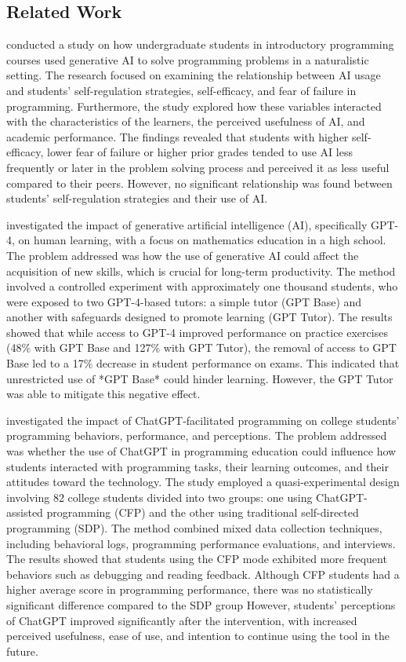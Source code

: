 \documentclass[a4paper,twoside]{article}
\begin{document}
\subsection{Related Work}

\cite{Margulieux24} conducted a study on how undergraduate students in
introductory programming courses used generative AI to solve programming
problems in a naturalistic setting. The research focused on examining the
relationship between AI usage and students’ self-regulation strategies,
self-efficacy, and fear of failure in programming. Furthermore, the study
explored how these variables interacted with the characteristics of the learners,
the perceived usefulness of AI, and academic performance. The findings revealed
that students with higher self-efficacy, lower fear of failure or higher prior
grades tended to use AI less frequently or later in the problem solving process
and perceived it as less useful compared to their peers. However, no significant
relationship was found between students’ self-regulation strategies and their
use of AI.

\cite{Bastani24} investigated the impact of generative artificial intelligence
(AI), specifically GPT-4, on human learning, with a focus on mathematics
education in a high school. The problem addressed was how the use of generative
AI could affect the acquisition of new skills, which is crucial for long-term
productivity. The method involved a controlled experiment with approximately
one thousand students, who were exposed to two GPT-4-based tutors: a simple
tutor (GPT Base) and another with safeguards designed to promote learning
(GPT Tutor). The results showed that while access to GPT-4 improved performance
on practice exercises (48\% with GPT Base and 127\% with GPT Tutor), the removal
of access to GPT Base led to a 17\% decrease in student performance on exams.
This indicated that unrestricted use of *GPT Base* could hinder learning.
However, the GPT Tutor was able to mitigate this negative effect.

\cite{Boudouaia24} investigated the impact of ChatGPT-facilitated programming on
college students’ programming behaviors, performance, and perceptions. The
problem addressed was whether the use of ChatGPT in programming education could
influence how students interacted with programming tasks, their learning
outcomes, and their attitudes toward the technology. The study employed a
quasi-experimental design involving 82 college students divided into two
groups: one using ChatGPT-assisted programming (CFP) and the other using
traditional self-directed programming (SDP). The method combined mixed data
collection techniques, including behavioral logs, programming performance
evaluations, and interviews. The results showed that students using the CFP mode
exhibited more frequent behaviors such as debugging and reading feedback.
Although CFP students had a higher average score in programming performance,
there was no statistically significant difference compared to the SDP group
However, students’ perceptions of ChatGPT improved significantly after the
intervention, with increased perceived usefulness, ease of use, and intention to
continue using the tool in the future.
\end{document}
